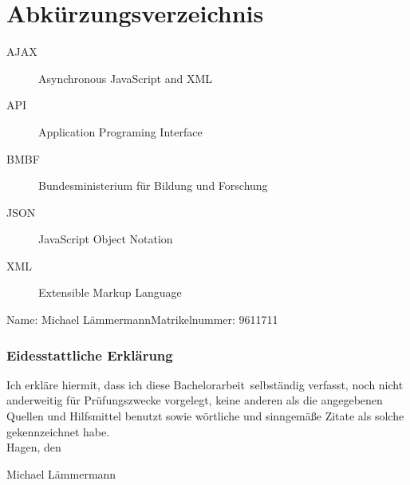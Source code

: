 \documentclass[twoside,bibliography=totoc,openany]{fumi}
\newcommand{\thesisauthor}{Michael Lämmermann}
\newcommand{\thesistype}{Bachelorarbeit} %
\newcommand{\thesismatrikelnummer}{9611711}
\begin{document}
\renewcommand\lstlistlistingname{Verzeichnis der Auflistungen}
\lstlistoflistings
\cleardoublepage


\renewcommand*\listalgorithmcfname{Verzeichnis der Algorithmen}
\listofalgorithms
\cleardoublepage


\chapter*{Abkürzungsverzeichnis}

\begin{description}
\item[AJAX] Asynchronous JavaScript and XML
\item[API] Application Programing Interface
\item[BMBF] Bundesministerium für Bildung und Forschung
\item[JSON] JavaScript Object Notation
\item[XML] Extensible Markup Language
\end{description}
\cleardoublepage


Name: \thesisauthor \hfill Matrikelnummer: \thesismatrikelnummer \vspace{2cm}
\subsection*{Eidesstattliche Erklärung}
Ich erkläre hiermit, dass ich diese \thesistype~selbständig verfasst, noch nicht anderweitig für Prüfungszwecke vorgelegt, keine anderen als die angegebenen Quellen und Hilfsmittel benutzt sowie wörtliche und sinngemäße Zitate als solche gekennzeichnet habe.\\[1cm]
Hagen, den \dotfill

\hspace{2cm}{\footnotesize Datum}\hspace{5cm} {\footnotesize \thesisauthor}
\end{document}
